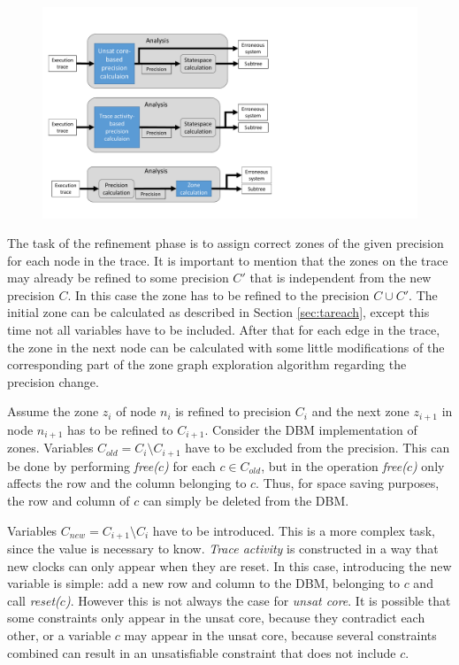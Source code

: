 \begin{figure}[h]
	\centering
	\includegraphics[width=\textwidth]{include/figures/modules_ssp_anal_zone}
\end{figure}


The task of the refinement phase is to assign correct zones of the given precision for each node in the trace. It is important to mention that the zones on the trace may already be refined to some precision $C'$ that is independent from the new precision $C$. In this case the zone has to be refined to the precision $C \cup C'$.  The initial zone can be calculated as described in Section \ref{sec:tareach}, except this time not all variables have to be included.  After that for each edge in the trace, the zone in the next node can be calculated with some little modifications of the corresponding part of the zone graph exploration algorithm regarding the precision change.

Assume the zone $z_i$ of node $n_i$ is refined to precision $C_i$ and the next zone $z_{i+1}$ in node $n_{i+1}$ has to be refined to $C_{i+1}$. Consider the DBM implementation of zones. Variables $C_{old}=C_{i} \setminus C_{i+1}$ have to be excluded from the precision. This can be done by performing \emph{free($c$)} for each $c \in C_{old}$, but in \cite{bengtsson2004timed} the operation \emph{free($c$)} only affects the row and the column belonging to $c$. Thus, for space saving purposes, the row and column of $c$ can simply be deleted from the DBM. 

Variables $C_{new}=C_{i+1} \setminus C_i$ have to be introduced. This is a more complex task, since the value is necessary to know. \emph{Trace activity} is constructed in a way that new clocks can only appear when they are reset. In this case, introducing the new variable is simple: add a new row and column to the DBM, belonging to $c$ and call \emph{reset($c$)}. However this is not always the case for \emph{unsat core}. It is possible that some constraints only appear in the unsat core, because they contradict each other, or a variable $c$ may appear in the unsat core, because several constraints combined can result in an unsatisfiable constraint that does not include $c$. 

